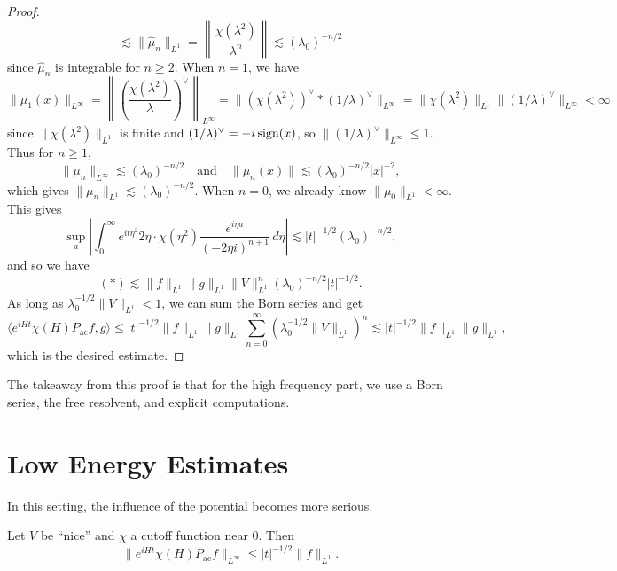 \begin{proof}
\[    \lesssim \|\widehat{\mu}_n\|_{L^1}
    = \left\| \frac{\chi(\lambda^2)}{\lambda^n} \right\|
    \lesssim (\lambda_0)^{-n / 2}
  \]
  since $\widehat{\mu}_n$ is integrable for $n \ge 2$.
  When $n = 1$, we have
  \[
    \|\mu_1(x)\|_{L^\infty}
    = \left\| \left(\frac{\chi(\lambda^2)}{\lambda}\right)^\vee \right\|_{L^\infty}
    = \| (\chi(\lambda^2))^\vee * (1 / \lambda)^\vee \|_{L^\infty}
    = \| \chi(\lambda^2) \|_{L^1} \|(1 / \lambda)^\vee\|_{L^\infty} < \infty
  \]
  since $\|\chi(\lambda^2)\|_{L^1}$ is finite and
  $(1 / \lambda)^\vee = -i \operatorname{sign}(x)$, so
  $\|(1 / \lambda)^\vee\|_{L^\infty} \le 1$. Thus
  for $n \ge 1$,
  \[
    \|\mu_n\|_{L^\infty} \lesssim (\lambda_0)^{-n / 2}
    \quad \text{and} \quad
    \|\mu_n(x)\| \lesssim (\lambda_0)^{-n / 2} |x|^{-2},
  \]
  which gives $\|\mu_n \|_{L^1} \lesssim (\lambda_0)^{-n / 2}$.
  When $n = 0$, we already know
  $\|\mu_0\|_{L^1} < \infty$. This gives
  \[
    \sup_a \left| \int_0^\infty e^{it\eta^2} 2\eta \cdot \chi(\eta^2) \frac{e^{i \eta a}}{(-2\eta i)^{n + 1}}\, d\eta \right|
    \lesssim |t|^{-1 / 2} (\lambda_0)^{-n / 2},
  \]
  and so we have
  \[
    (*) \lesssim \|f\|_{L^1} \|g\|_{L^1} \|V\|_{L^1}^n (\lambda_0)^{-n / 2} |t|^{-1 / 2}.
  \]
  As long as $\lambda_0^{-1 / 2} \| V \|_{L^1} < 1$,
  we can sum the Born series and get
  \[
    \langle e^{iHt} \chi(H) P_{\mathrm{ac}} f, g \rangle
    \le |t|^{-1 / 2} \|f\|_{L^1} \|g\|_{L^1} \sum_{n = 0}^\infty (\lambda_0^{-1 / 2} \|V\|_{L^1})^n
    \lesssim |t|^{-1 / 2} \|f\|_{L^1} \|g\|_{L^1},
  \]
  which is the desired estimate.
\end{proof}

\begin{remark}
  The takeaway from this proof is that for the
  high frequency part, we use a Born series, the
  free resolvent, and explicit computations.
\end{remark}

\section{Low Energy Estimates}

\begin{remark}
  In this setting, the influence of the potential
  becomes more serious.
\end{remark}

\begin{lemma}\label{lem:low-energy}
  Let $V$ be ``nice'' and $\chi$ a cutoff function
  near $0$. Then
  \[
    \| e^{iHt} \chi(H) P_{\mathrm{ac}} f \|_{L^\infty}
    \le |t|^{-1 / 2} \|f\|_{L^1}.
  \]
\end{lemma}

